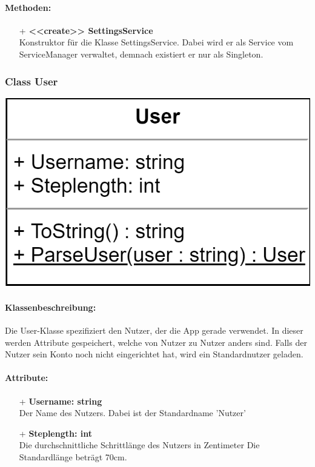 \documentclass[a4paper,12pt]{article}
\begin{document}
  \paragraph{Methoden:}
	\begin{itemize}
		\item[+] \textbf{<<create>> SettingsService}\\Konstruktor für die Klasse SettingsService. Dabei wird er als Service vom ServiceManager verwaltet, demnach existiert er nur als Singleton.\\
		\newline
	\end{itemize}



\begin{minipage}[b]{0.6\textwidth}
	\subsubsection{Class User}
\end{minipage}
\begin{minipage}[c]{0.5\textwidth}
	\includegraphics{bilder/EMKlassen/UserClass.png}
\end{minipage}

	\paragraph{Klassenbeschreibung:}
	Die User-Klasse spezifiziert den Nutzer, der die App gerade verwendet. In dieser werden Attribute gespeichert, welche von Nutzer zu Nutzer anders sind. Falls der Nutzer sein Konto noch nicht eingerichtet hat, wird ein Standardnutzer geladen.\\
	\paragraph{Attribute:}
	\begin{itemize}
		\item[+] \textbf{Username: string}\\Der Name des Nutzers. Dabei ist der Standardname 'Nutzer'\\
		\item[+] \textbf{Steplength: int}\\Die durchschnittliche Schrittlänge des Nutzers in Zentimeter Die Standardlänge beträgt 70cm.\\

	\end{itemize}
\end{document}
